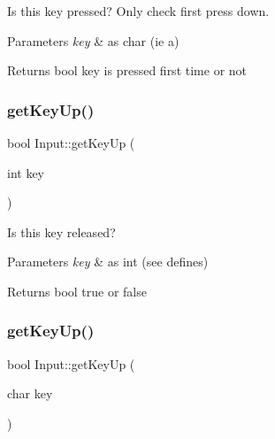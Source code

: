Is this key pressed? Only check first press down. 


\begin{DoxyParams}{Parameters}
{\em key} & as char (ie \textquotesingle{}a\textquotesingle{}) \\
\hline
\end{DoxyParams}
\begin{DoxyReturn}{Returns}
bool key is pressed first time or not 
\end{DoxyReturn}
\mbox{\label{class_input_a965184281347f881d145aac555b727d7}} 
\subsubsection{\texorpdfstring{get\+Key\+Up()}{getKeyUp()}\hspace{0.1cm}{\footnotesize\ttfamily [1/2]}}
{\footnotesize\ttfamily bool Input\+::get\+Key\+Up (\begin{DoxyParamCaption}\item[{int}]{key }\end{DoxyParamCaption})\hspace{0.3cm}{\ttfamily [inline]}}



Is this key released? 


\begin{DoxyParams}{Parameters}
{\em key} & as int (see defines) \\
\hline
\end{DoxyParams}
\begin{DoxyReturn}{Returns}
bool true or false 
\end{DoxyReturn}
\mbox{\label{class_input_a4e75aadc94c3d0fb2b236388b5dddec7}} 
\subsubsection{\texorpdfstring{get\+Key\+Up()}{getKeyUp()}\hspace{0.1cm}{\footnotesize\ttfamily [2/2]}}
{\footnotesize\ttfamily bool Input\+::get\+Key\+Up (\begin{DoxyParamCaption}\item[{char}]{key }\end{DoxyParamCaption})\hspace{0.3cm}{\ttfamily [inline]}}



